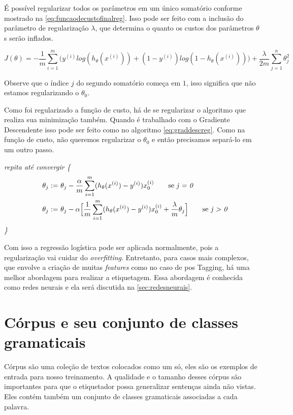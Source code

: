 É possível regularizar todos os parâmetros em um único somatório conforme mostrado na \autoref{eq:funcaodecustofinalreg}. Isso pode ser feito com a inclusão do parâmetro de regularização $\lambda$, que determina o quanto os custos dos parâmetros $\theta$s serão inflados.

\begin{equation} \label{eq:funcaodecustofinalreg}
J(\theta) = - \frac{1}{m}\sum\limits_{i=1}^{m}\Big( y^{(i)}log(h_{\theta}(x^{(i)})) + (1-y^{(i)})log(1 - h_{\theta}(x^{(i)})) \Big)
+ \frac{\lambda}{2m}\sum\limits_{j=1}^{n} \theta_j^2
\end{equation}

Observe que o índice $j$ do segundo somatório começa em $1$, isso significa que não estamos regularizando o $\theta_0$.

Como foi regularizado a função de custo, há de se regularizar o algoritmo que realiza sua minimização também. Quando é trabalhado com o Gradiente Descendente isso pode ser feito como no algoritmo \ref{eq:graddescreg}. Como na função de custo, não queremos regularizar o $\theta_0$ e então precisamos separá-lo em um outro passo.

\textit{repita até convergir \{}
\begin{align} 
\quad \theta_j := &\ \theta_j - \frac{\alpha}{m} \sum\limits_{i=1}^{m}(h_{\theta}(x^{(i)}) - y^{(i)}) x_0^{(i)} \quad\quad \text{se \textit{j = 0}} \nonumber \\
\quad \theta_j := &\ \theta_j - \alpha \Big[ \frac{1}{m} \sum\limits_{i=1}^{m} (h_{\theta}(x^{(i)}) - y^{(i)}) x_0^{(i)} + \frac{\lambda}{m}\theta_j \Big] \quad\quad \text{se \textit{j > 0}} \label{eq:graddescreg}
\end{align}
\textit{\quad\quad\quad \}}

Com isso a regressão logística pode ser aplicada normalmente, pois a regularização vai cuidar do \textit{overfitting}. Entretanto, para casos mais complexos, que envolve a criação de muitas \textit{features} como no caso de \ac{pos} Tagging, há uma melhor abordagem para realizar a etiquetagem. Essa abordagem é conhecida como redes neurais e ela será discutida na \autoref{sec:redesneurais}.


\section{Córpus e seu conjunto de classes gramaticais}

Córpus são uma coleção de textos colocados como um só, eles são os exemplos de entrada para nosso treinamento. A qualidade e o tamanho desses córpus são importantes para que o etiquetador possa generalizar sentenças ainda não vistas. Eles contém também um conjunto de classes gramaticais associadas a cada palavra.

